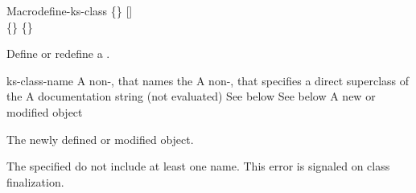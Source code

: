 \documentclass[10pt,twoside,english,pdftex]{article}
\begin{document}

\begin{functiondoc}{Macro}{define-ks-class}%
   { 
   \code{(}\{\}\superstar\code{)}
   [] \\
   \code{(}\{\}\superstar\code{)}
   \{\}\superstar{}
   \returns{} }
%
%
%

\fnsyntax

\fnpurpose Define or redefine a .

\fnpackage {}

\fnmodule {}

\fnargs
\begin{args}{ks-class-name}
 A non-\nil,  that names the
 A non-\nil,  that specifies a
direct superclass of the    
\arg[documentation] A documentation string (not evaluated)
 See below
 See below
 A new or modified  object
\end{args}

\fnreturns The newly defined or modified  object.

\fnerrors The specified  do not include at least
one  name.  This error is signaled on class finalization.


\end{functiondoc}
\end{document}
